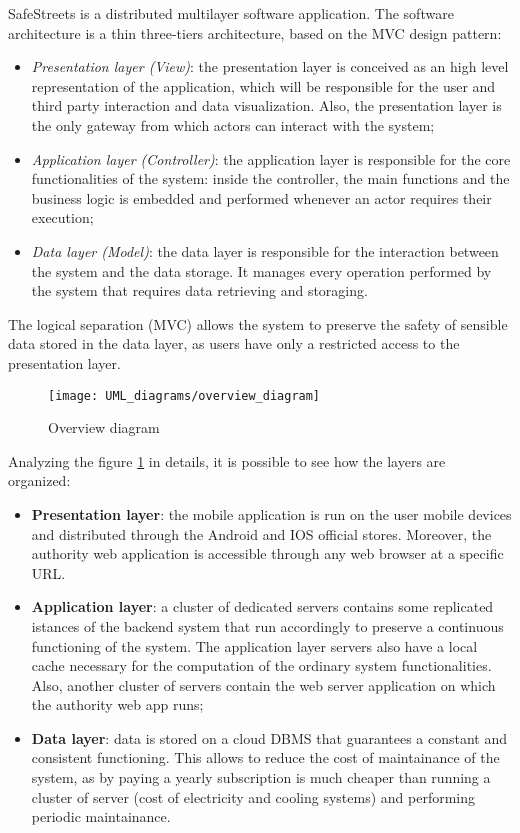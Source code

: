 SafeStreets is a distributed multilayer software application. The software architecture is a thin three-tiers architecture, based on the MVC design pattern:
\begin{itemize}
    \item \textit{Presentation layer (View)}: the presentation layer is conceived as an high level representation of the application, which will be responsible for the user and third party interaction and data visualization. Also, the presentation layer is the only gateway from which actors can interact with the system;
    \item \textit{Application layer (Controller)}: the application layer is responsible for the core functionalities of the system: inside the controller, the main functions and the business logic is embedded and performed whenever an actor requires their execution;
    \item \textit{Data layer (Model)}: the data layer is responsible for the interaction between the system and the data storage. It manages every operation performed by the system that requires data retrieving and storaging.
\end{itemize}
The logical separation (MVC) allows the system to preserve the safety of sensible data stored in the data layer, as users have only a restricted access to the presentation layer.
\begin{figure}[H]
    \centering
    \texttt{[image: UML\_diagrams/overview\_diagram]}
    \caption{Overview diagram}
    \label{fig:overview_diagram}
\end{figure}
Analyzing the figure \ref{fig:overview_diagram} in details, it is possible to see how the layers are organized:
\begin{itemize}
    \item \textbf{Presentation layer}: the mobile application is run on the user mobile devices and distributed through the Android and IOS official stores. Moreover, the authority web application is accessible through any web browser at a specific URL.
    \item \textbf{Application layer}: a cluster of dedicated servers contains some replicated istances of the backend system that run accordingly to preserve a continuous functioning of the system. The application layer servers also have a local cache necessary for the computation of the ordinary system functionalities. Also, another cluster of servers contain the web server application on which the authority web app runs; 
    \item \textbf{Data layer}: data is stored on a cloud DBMS that guarantees a constant and consistent functioning. This allows to reduce the cost of maintainance of the system, as by paying a yearly subscription is much cheaper than running a cluster of server (cost of electricity and cooling systems) and performing periodic maintainance.
\end{itemize} 
